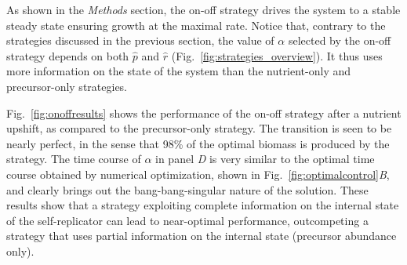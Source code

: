 As shown in the \textit{Methods} section, the on-off strategy drives the system to a stable steady state ensuring growth at the maximal rate.
Notice that, contrary to the strategies discussed in the previous section, the value of $\alpha$ selected by the on-off strategy depends on both $\hat{p}$ and $\hat{r}$ (Fig.~\ref{fig:strategies_overview}).
It thus uses more information on the state of the system than the nutrient-only and precursor-only strategies.

Fig.~\ref{fig:onoffresults} shows the performance of the on-off strategy after a nutrient upshift, as compared to the precursor-only strategy.
The transition is seen to be nearly perfect, in the sense that 98\% of the optimal biomass is produced by the strategy.
The time course of $\alpha$ in panel \textit{D} is very similar to the optimal time course obtained by numerical optimization, shown in Fig.~\ref{fig:optimalcontrol}\textit{B}, and clearly brings out the bang-bang-singular nature of the solution. 
These results show that a strategy exploiting complete information on the internal state of the self-replicator can lead to near-optimal performance, outcompeting a strategy that uses partial information on the internal state (precursor abundance only).

